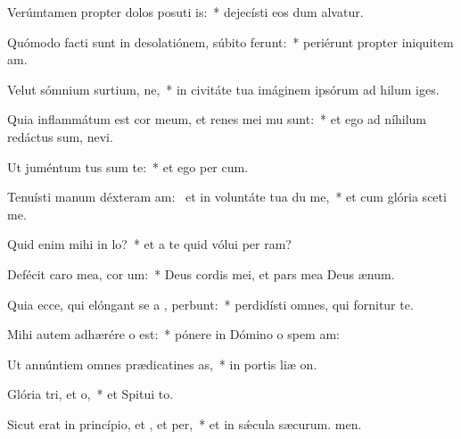 \item Verúmtamen propter dolos posuti is:~* dejecísti eos dum alvatur.
\item Quómodo facti sunt in desolatiónem, súbito ferunt:~* periérunt propter iniquitem am.
\item Velut sómnium surtium, ne,~* in civitáte tua imáginem ipsórum ad hilum iges.
\item Quia inflammátum est cor meum, et renes mei mu sunt:~* et ego ad níhilum redáctus sum,  nevi.
\item Ut juméntum tus sum  te:~* et ego per cum.
\item Tenuísti manum déxteram am:~\pscross{} et in voluntáte tua du me,~* et cum glória sceti me.
\item Quid enim mihi  in lo?~* et a te quid vólui per ram?
\item Defécit caro mea,  cor um:~* Deus cordis mei, et pars mea Deus  ænum.
\item Quia ecce, qui elóngant se a , perbunt:~* perdidísti omnes, qui fornitur  te.
\item Mihi autem adhærére o  est:~* pónere in Dómino o spem am:
\item Ut annúntiem omnes prædicatines as,~* in portis liæ on.
\item Glória tri, et o,~* et Spitui to.
\item Sicut erat in princípio, et , et per,~* et in sǽcula sæcurum. men.

